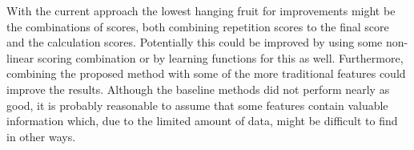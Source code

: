 With the current approach the lowest hanging fruit for improvements might be the combinations of scores, both combining repetition scores to the final score and the calculation scores. Potentially this could be improved by using some non-linear scoring combination or by learning functions for this as well. Furthermore, combining the proposed method with some of the more traditional features could improve the results. Although the baseline methods did not perform nearly as good, it is probably reasonable to assume that some features contain valuable information which, due to the limited amount of data, might be difficult to find in other ways.

